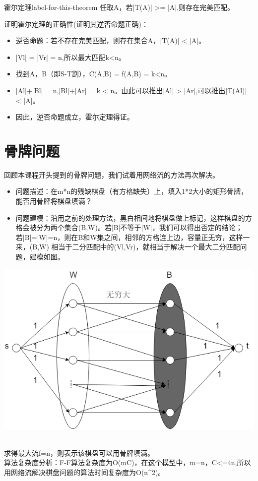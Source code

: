 \begin{theorem}{霍尔定理}{label-for-this-theorem}
  任取A\subseteqVl，若|T(A)| >= |A|,则存在完美匹配。
\end{theorem}
证明霍尔定理的正确性(证明其逆否命题正确)：
\begin{itemize}
  \item 逆否命题：若不存在完美匹配，则存在集合A，|T(A)| < |A|。
  \item |Vl| = |Vr| = n,所以最大匹配k<n。
  \item 找到A，B（即S-T割），C(A,B) = f(A,B) = k<n。
  \item |Al|+|Bl| = n,|Bl|+|Ar| = k < n。由此可以推出|Al| > |Ar|,可以推出|T(Al)| < |A|。
  \item 因此，逆否命题成立，霍尔定理得证。
\end{itemize}

\section{骨牌问题}
回顾本课程开头提到的骨牌问题，我们试着用网络流的方法再次解决。\\
\begin{itemize}
  \item 问题描述：在m*n的残缺棋盘（有方格缺失）上，填入1*2大小的矩形骨牌，能否用骨牌将棋盘填满？\\
  \item 问题建模：沿用之前的处理方法，黑白相间地将棋盘做上标记，这样棋盘的方格会被分为两个集合(B,W)。若|B|不等于|W|，我们可以得出否定的结论；若|B|=|W|=n，则在B和W集之间，相邻的方格连上边，容量正无穷，这样一来，(B,W) 相当于二分匹配中的(Vl,Vr)，就相当于解决一个最大二分匹配问题，建模如图。\\
\end{itemize}
\centerline{\includegraphics[scale=0.6]{Ln11.image/networkflow4.png}}
\\求得最大流f=n，则表示该棋盘可以用骨牌填满。\\
算法复杂度分析：F-F算法复杂度为O(mC)，在这个模型中，m=n，C<=4n,所以用网络流解决棋盘问题的算法时间复杂度为O(n^2)。

